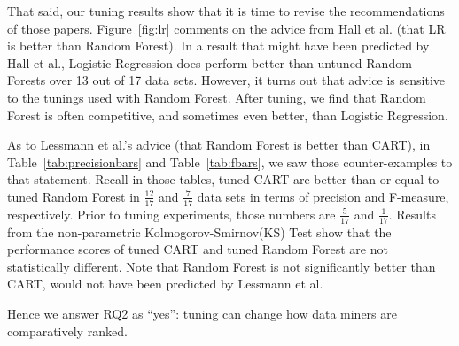 \documentclass[smallextended]{svjour3}
\newcommand{\fig}[1]{Figure~\ref{fig:#1}}
\newcommand{\tab}[1]{Table~\ref{tab:#1}}
\begin{document}
That said, our tuning results show that it is time to revise
the recommendations of those papers. 
  \fig{lr} comments on the advice from Hall et al. (that LR is better than Random Forest).
 In a result that might have been predicted by Hall et al., Logistic Regression does perform better than untuned Random
Forests over 13 out of 17 data sets. 
However, it turns out that advice is sensitive to the tunings
used with Random Forest. After tuning, we find that Random Forest
is often competitive, and sometimes even better, than Logistic Regression. 


As to Lessmann et al.'s advice (that Random Forest is better than 
CART),  
in \tab{precisionbars} and \tab{fbars}, we saw those counter-examples
to that statement.
Recall in those tables,
tuned CART are better than or equal
to tuned Random Forest in $\frac{12}{17}$ and $\frac{7}{17}$ data sets in
terms of precision and F-measure, respectively. Prior to tuning experiments, those
numbers are $\frac{5}{17}$ and $\frac{1}{17}$. Results from the non-parametric
Kolmogorov-Smirnov(KS) Test show that the performance 
scores of tuned CART and tuned Random Forest are not statistically different.
Note that Random Forest is  not significantly better than CART, would not have been
predicted by   Lessmann et al.
  

Hence we answer RQ2 as ``yes'': tuning can change how  data miners are comparatively ranked.
 


\end{document}
